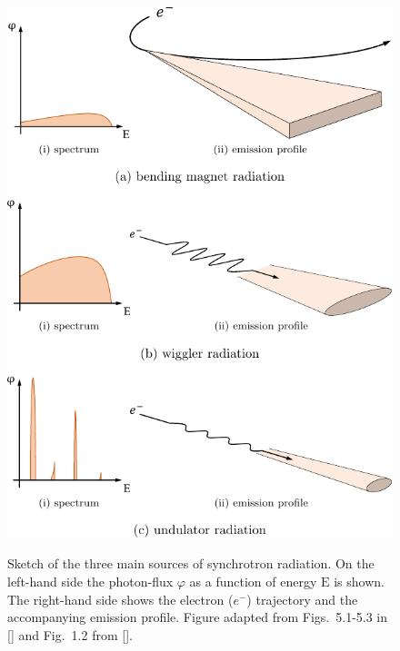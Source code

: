 \begin{refsection}
\begin{figure}[t]
    \centering
    {\includegraphics[width=.6\linewidth]{figures/ch02/x-ray_sources.pdf}}
    \caption[Synchrotron radiation emission]{Sketch of the three main sources of synchrotron radiation. On the left-hand side the photon-flux $\varphi$ as a function of energy $\mathrm{E}$ is shown. The right-hand side shows the electron ($e^-$) trajectory and the accompanying emission profile. Figure adapted from Figs.~5.1-5.3 in [\cite{Attwood1999}] and Fig.~1.2 from [\cite{Clarke2004}].}
    \label{fig:emission}
\end{figure}


\end{refsection}
